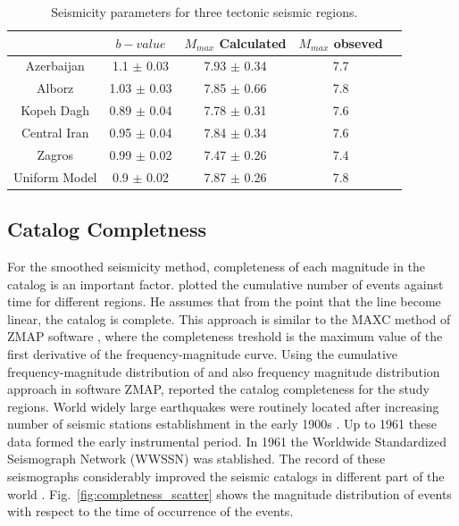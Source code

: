 \noindent


\begin{table}[!ht]
\centering
\caption{Seismicity parameters for three tectonic seismic regions.}
    \begin{tabular}{ccccc}
    ~                          &         $b-value$     &   $M_{max} $  Calculated & $M_{max}$ obseved \\ \hline
    Azerbaijan           & 1.1   $\pm$ 0.03   &   7.93  $\pm$  0.34           &   7.7      			    \\ \hline
    Alborz                  &1.03  $\pm$ 0.03   &   7.85  $\pm$  0.66           &   7.8          	            \\ \hline
    Kopeh Dagh        & 0.89 $\pm$ 0.04   &   7.78  $\pm$  0.31           &   7.6          	            \\ \hline
    Central Iran         & 0.95 $\pm$ 0.04   &   7.84  $\pm$  0.34           &   7.6                           \\ \hline
    Zagros                 & 0.99 $\pm$ 0.02  &   7.47  $\pm$  0.26            &  7.4                            \\ \hline
    Uniform Model    & 0.9    $\pm$ 0.02  &   7.87  $\pm$  0.26            &  7.8                            \\ 
    \end{tabular}
 \label{tab:b_value} 
\end{table}

\subsection{Catalog Completness}
For the smoothed seismicity method, completeness of each magnitude in the catalog is an important factor.  \citet{Frankel1995} plotted the cumulative number of events against time for different regions. He assumes that from the point that the line become linear, the catalog is complete. This approach is similar to the MAXC method of ZMAP software \citep{Wiemer2001}, where the completeness treshold is the maximum value of the first derivative of the frequency-magnitude curve. Using the cumulative frequency-magnitude distribution of \citet{Gutenberg1944} and also frequency magnitude distribution approach in software ZMAP, \citet{Zare2014} reported the catalog completeness for the study regions. World widely large earthquakes were routinely located after increasing number of seismic stations establishment in the early 1900s \citep{Shearer2009}. Up to 1961 these data formed the early instrumental period. In 1961 the Worldwide Standardized Seismograph Network (WWSSN) was stablished. The record of these seismographs considerably improved the seismic catalogs in different part of the world \citep{Shearer2009}. Fig.~\ref{fig:completness_scatter} shows the magnitude distribution of events with respect to the time of occurrence of the events.

